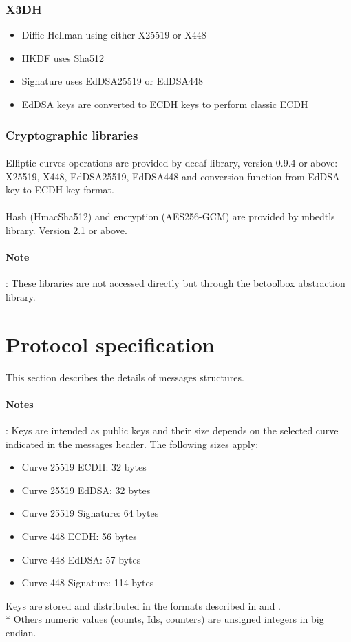 \documentclass[a4paper,11pt]{article}
\begin{document}
    \subsubsection{X3DH}
      \begin{itemize}
        \item Diffie-Hellman using either X25519 or X448
        \item HKDF uses Sha512
        \item Signature uses EdDSA25519 or EdDSA448
        \item EdDSA keys are converted to ECDH keys to perform classic ECDH
      \end{itemize}
  
  \subsubsection{Cryptographic libraries}
    \paragraph{}Elliptic curves operations are provided by decaf library\cite{libdecaf}, version 0.9.4 or above: X25519, X448, EdDSA25519, EdDSA448 and conversion function from EdDSA key to ECDH key format.
    \paragraph{}Hash (HmacSha512) and encryption (AES256-GCM) are provided by mbedtls library\cite{libmbedtls}. Version 2.1 or above.
    \paragraph{Note}: These libraries are not accessed directly but through the bctoolbox abstraction library.

\section{Protocol specification}
  This section describes the details of messages structures.
  \paragraph*{Notes}: Keys are intended as public keys and their size depends on the selected curve indicated in the messages header. The following sizes apply:
  \begin{itemize}
    \item Curve 25519 ECDH: 32 bytes
    \item Curve 25519 EdDSA: 32 bytes
    \item Curve 25519 Signature: 64 bytes
    \item Curve 448 ECDH: 56 bytes
    \item Curve 448 EdDSA: 57 bytes
    \item Curve 448 Signature: 114 bytes
  \end{itemize}
  Keys are stored and distributed in the formats described in \cite{rfc7748} and \cite{rfc8032}.\\*
  Others numeric values (counts, Ids, counters) are unsigned integers in big endian.
  
\end{document}

